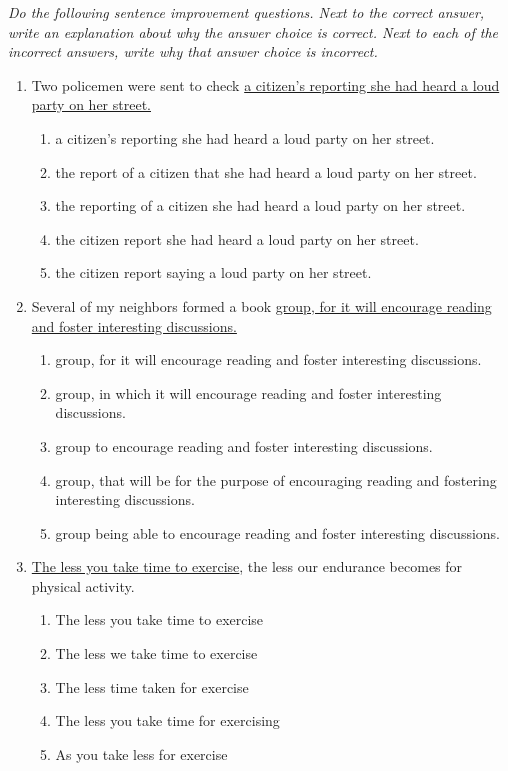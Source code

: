 \documentclass[12pt]{book}
\begin{document}
\textit{Do the following sentence improvement questions. Next to the correct answer, write an explanation about why the answer choice is correct. Next to each of the incorrect answers, write why that answer choice is incorrect.}

\begin{enumerate}
\item Two policemen were sent to check \ul{a citizen's reporting she had heard a loud party on her street.}

\begin{enumerate}[label=(\Alph*)]
\item a citizen's reporting she had heard a loud party on her street. 
\item the report of a citizen that she had heard a loud party on her street.
\item the reporting of a citizen she had heard a loud party on her street.
\item the citizen report she had heard a loud party on her street.
\item the citizen report saying a loud party on her street.
\end{enumerate}

\bigskip
\item Several of my neighbors formed a book \ul{group, for it will encourage reading and foster interesting discussions.}
\begin{enumerate}[label=(\Alph*)]
\item group, for it will encourage reading and foster interesting discussions.
\item group, in which it will encourage reading and foster interesting discussions.
\item group to encourage reading and foster interesting discussions.
\item group, that will be for the purpose of encouraging reading and fostering interesting discussions.
\item group being able to encourage reading and foster interesting discussions.
\end{enumerate}

\bigskip
\item \underline{The less you take time to exercise}, the less our endurance becomes for physical activity.
\begin{enumerate}[label=(\Alph*)]
\item The less you take time to exercise
\item The less we take time to exercise
\item The less time taken for exercise
\item The less you take time for exercising
\item As you take less for exercise
\end{enumerate}
\end{enumerate}
\end{document}
